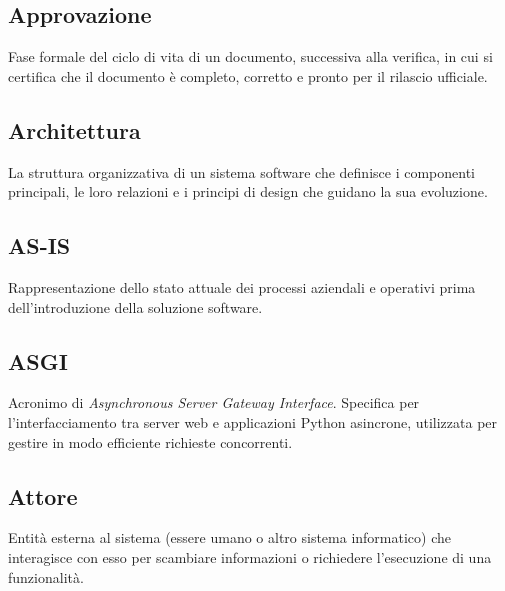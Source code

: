 \documentclass[a4paper, 11pt, oneside]{scrartcl} %
\begin{document}
\subsection*{Approvazione}


Fase formale del ciclo di vita di un documento, successiva alla verifica, in cui si certifica che il documento è completo, corretto e pronto per il rilascio ufficiale.

\vspace{0.5cm}

\subsection*{Architettura}


La struttura organizzativa di un sistema software che definisce i componenti principali, le loro relazioni e i principi di design che guidano la sua evoluzione.

\vspace{0.5cm}

\subsection*{AS-IS}
Rappresentazione dello stato attuale dei processi aziendali e operativi prima dell'introduzione della soluzione software.
\vspace{0.5cm}

\subsection*{ASGI}
Acronimo di \textit{Asynchronous Server Gateway Interface}. Specifica per l'interfacciamento tra server web e applicazioni Python asincrone, utilizzata per gestire in modo efficiente richieste concorrenti.
\vspace{0.5cm}

\subsection*{Attore}
Entità esterna al sistema (essere umano o altro sistema informatico) che interagisce con esso per scambiare informazioni o richiedere l'esecuzione di una funzionalità.
\vspace{0.5cm}
\end{document}
